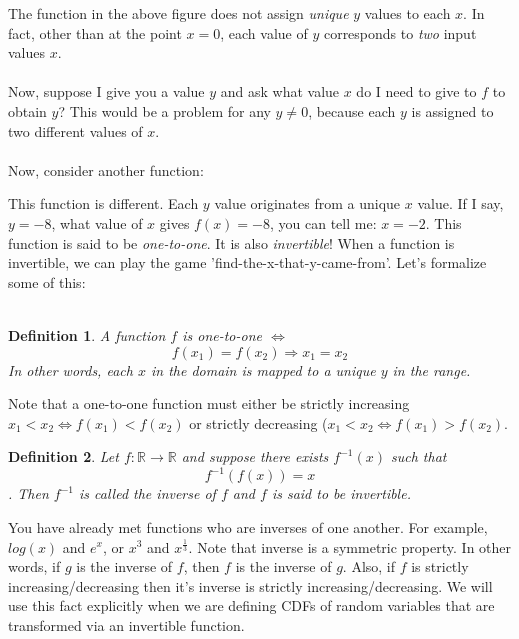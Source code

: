 \documentclass[12pt]{article} %
\newtheorem{defn}{Definition}
\begin{document}
The function in the above figure does not assign \emph{unique} $y$ values to each $x$. In fact, other than at the point $x=0$, each value of $y$ corresponds to \emph{two} input values $x$. \\\\
Now, suppose I give you a value $y$ and ask what value $x$ do I need to give to $f$ to obtain $y$? This would be a problem for any $y\neq 0$, because each $y$ is assigned to two different values of $x$.\\\\
Now, consider another function:


This function is different. Each $y$ value originates from a unique $x$ value. If I say, $y=-8$, what value of $x$ gives $f(x) = -8$, you can tell me: $x=-2$. This function is said to be \emph{one-to-one}. It is also \emph{invertible}! When a function is invertible, we can play the game 'find-the-x-that-y-came-from'. Let's formalize some of this:\\\\

\begin{defn}

A function $f$ is one-to-one $\iff$ 
$$f(x_1)=f(x_2) \Rightarrow x_1=x_2$$
In other words, each $x$ in the domain is mapped to a unique $y$ in the range.

\end{defn}

Note that a one-to-one function must either be strictly increasing $x_1<x_2 \iff f(x_1)<f(x_2)$ or strictly decreasing ($x_1<x_2\iff f(x_1)>f(x_2)$. 

\begin{defn}
Let $f:\mathbb{R}\rightarrow\mathbb{R}$ and suppose there exists $f^{-1}(x)$ such that 
$$f^{-1}(f(x)) = x$$.
Then $f^{-1}$ is called the \emph{inverse} of $f$ and $f$ is said to be \emph{invertible}.
\end{defn}

You have already met functions who are inverses of one another. For example, $log(x)$ and $e^x$, or $x^3$ and $x^{\frac13}$. Note that inverse is a symmetric property. In other words, if $g$ is the inverse of $f$, then $f$ is the inverse of $g$. Also, if $f$ is strictly increasing/decreasing then it's inverse is strictly increasing/decreasing. We will use this fact explicitly when we are defining CDFs of random variables that are transformed via an invertible function.
\end{document}
